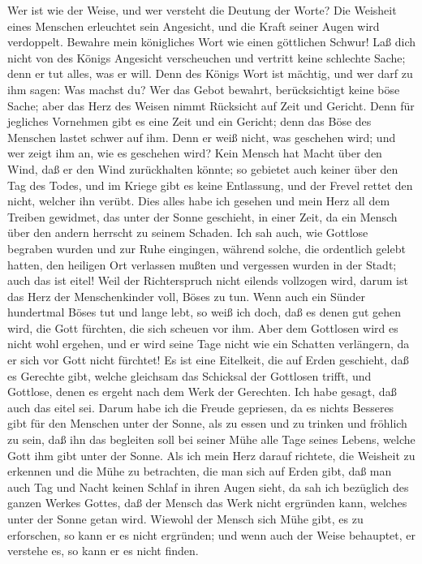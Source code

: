  Wer ist wie der Weise, und wer versteht die Deutung der
Worte? Die Weisheit eines Menschen erleuchtet sein Angesicht, und die
Kraft seiner Augen wird verdoppelt.  Bewahre mein
königliches Wort wie einen göttlichen Schwur!  Laß dich
nicht von des Königs Angesicht verscheuchen und vertritt keine schlechte
Sache; denn er tut alles, was er will.  Denn des Königs
Wort ist mächtig, und wer darf zu ihm sagen: Was machst du?
 Wer das Gebot bewahrt, berücksichtigt keine böse Sache;
aber das Herz des Weisen nimmt Rücksicht auf Zeit und Gericht.
 Denn für jegliches Vornehmen gibt es eine Zeit und ein
Gericht; denn das Böse des Menschen lastet schwer auf ihm.
 Denn er weiß nicht, was geschehen wird; und wer zeigt ihm
an, wie es geschehen wird?  Kein Mensch hat Macht über den
Wind, daß er den Wind zurückhalten könnte; so gebietet auch keiner über
den Tag des Todes, und im Kriege gibt es keine Entlassung, und der
Frevel rettet den nicht, welcher ihn verübt.  Dies alles
habe ich gesehen und mein Herz all dem Treiben gewidmet, das unter der
Sonne geschieht, in einer Zeit, da ein Mensch über den andern herrscht
zu seinem Schaden.  Ich sah auch, wie Gottlose begraben
wurden und zur Ruhe eingingen, während solche, die ordentlich gelebt
hatten, den heiligen Ort verlassen mußten und vergessen wurden in der
Stadt; auch das ist eitel!  Weil der Richterspruch nicht
eilends vollzogen wird, darum ist das Herz der Menschenkinder voll,
Böses zu tun.  Wenn auch ein Sünder hundertmal Böses tut
und lange lebt, so weiß ich doch, daß es denen gut gehen wird, die Gott
fürchten, die sich scheuen vor ihm.  Aber dem Gottlosen
wird es nicht wohl ergehen, und er wird seine Tage nicht wie ein
Schatten verlängern, da er sich vor Gott nicht fürchtet! 
Es ist eine Eitelkeit, die auf Erden geschieht, daß es Gerechte gibt,
welche gleichsam das Schicksal der Gottlosen trifft, und Gottlose, denen
es ergeht nach dem Werk der Gerechten. Ich habe gesagt, daß auch das
eitel sei.  Darum habe ich die Freude gepriesen, da es
nichts Besseres gibt für den Menschen unter der Sonne, als zu essen und
zu trinken und fröhlich zu sein, daß ihn das begleiten soll bei seiner
Mühe alle Tage seines Lebens, welche Gott ihm gibt unter der Sonne.
 Als ich mein Herz darauf richtete, die Weisheit zu
erkennen und die Mühe zu betrachten, die man sich auf Erden gibt, daß
man auch Tag und Nacht keinen Schlaf in ihren Augen sieht,
 da sah ich bezüglich des ganzen Werkes Gottes, daß der
Mensch das Werk nicht ergründen kann, welches unter der Sonne getan
wird. Wiewohl der Mensch sich Mühe gibt, es zu erforschen, so kann er es
nicht ergründen; und wenn auch der Weise behauptet, er verstehe es, so
kann er es nicht finden.

